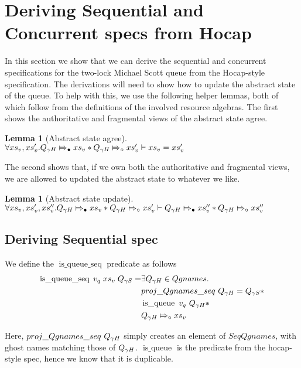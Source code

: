 \documentclass[twoside,11pt,openright]{report}
\newtheorem{lemma}[theorem]{Lemma}
\newcommand{\isqueue}{\operatorname{is\_queue}}
\newcommand{\isqueueseq}{\operatorname{is\_queue\_seq}}
\newcommand{\abstractstatefullfrag}[2]{#1 \Mapsto_{\circ} #2}
\newcommand{\abstractstateauth}[2]{#1 \Mapsto_{\bullet} #2}
\begin{document}
\section{Deriving Sequential and Concurrent specs from Hocap}\label{section:two_lock:deriving_seq_and_conc}
In this section we show that we can derive the sequential and concurrent specifications for the two-lock Michael Scott queue from the Hocap-style specification. The derivations will need to show how to update the abstract state of the queue. To help with this, we use the following helper lemmas, both of which follow from the definitions of the involved resource algebras. The first shows the authoritative and fragmental views of the abstract state agree.
\begin{lemma}[Abstract state agree]\label{MSQTL:hocap:abst:agree}
  $\All xs_v, xs_v' .\\
  \abstractstateauth{Q_{\gname H}}{xs_v} \ast \abstractstatefullfrag{Q_{\gname H}}{xs_v'} \proves xs_v = xs_v'$
\end{lemma}
The second shows that, if we own both the authoritative and fragmental views, we are allowed to updated the abstract state to whatever we like.
\begin{lemma}[Abstract state update]\label{MSQTL:hocap:abst:update}
  $\All xs_v, xs_v', xs_v'' .\\
  \abstractstateauth{Q_{\gname H}}{xs_v} \ast \abstractstatefullfrag{Q_{\gname H}}{xs_v'} \proves \abstractstateauth{Q_{\gname H}}{xs_v''} \ast \abstractstatefullfrag{Q_{\gname H}}{xs_v''}$
\end{lemma}

\subsection{Deriving Sequential spec}
We define the $\isqueueseq$ predicate as follows
\begin{align*}
  \isqueueseq \; v_q \; xs_v \; Q_{\gname S} =
    &\Exists Q_{\gname H} \in Qgnames .\\
    &proj\_Qgnames\_seq \ Q_{\gname H} = Q_{\gname S} \ast\\
    &\isqueue \ v_q \ Q_{\gname H} \ast\\
    &\abstractstatefullfrag{Q_{\gname H}}{xs_v}
\end{align*}

Here, $proj\_Qgnames\_seq \ Q_{\gamma H}$ simply creates an element of $SeqQgnames$, with ghost names matching those of $Q_{\gamma H}$.
$\isqueue$ is the predicate from the hocap-style spec, hence we know that it is duplicable.
\end{document}
